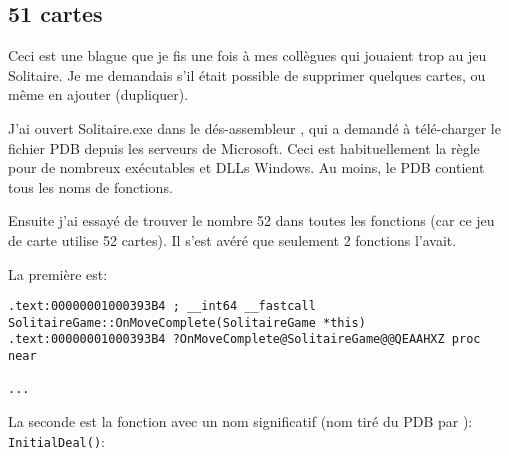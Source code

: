 \subsection{51 cartes}

\renewcommand{\CURPATH}{examples/solitaire/51}

Ceci est une blague que je fis une fois à mes collègues qui jouaient trop au jeu
Solitaire.
Je me demandais s'il était possible de supprimer quelques cartes, ou même en ajouter
(dupliquer).

J'ai ouvert Solitaire.exe dans le dés-assembleur \IDA, qui a demandé à télé-charger
le fichier PDB depuis les serveurs de Microsoft.
Ceci est habituellement la règle pour de nombreux exécutables et DLLs Windows.
Au moins, le PDB contient tous les noms de fonctions.

Ensuite j'ai essayé de trouver le nombre 52 dans toutes les fonctions (car ce jeu
de carte utilise 52 cartes).
Il s'est avéré que seulement 2 fonctions l'avait.

La première est:

\begin{lstlisting}
.text:00000001000393B4 ; __int64 __fastcall SolitaireGame::OnMoveComplete(SolitaireGame *this)
.text:00000001000393B4 ?OnMoveComplete@SolitaireGame@@QEAAHXZ proc near

...
\end{lstlisting}

La seconde est la fonction avec un nom significatif (nom tiré du PDB par \IDA):
\verb|InitialDeal()|:

